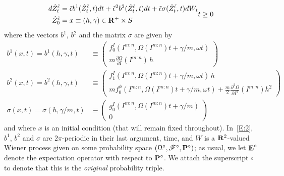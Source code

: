 \begin{equation}
\begin{aligned}
d \hat Z_t^{\tilde\epsilon} &= \tilde\epsilon  b^1 (\hat Z_t^{\tilde\epsilon},t) dt
  + \tilde\epsilon^2 b^2 (\hat Z_t^{\tilde\epsilon},t) dt
+ \tilde\epsilon \sigma(\hat Z_t^{\tilde\epsilon},t) d W_t \\
\hat Z^{\tilde\epsilon}_{0} &= x\equiv(h,\gamma) \in \mathbf R^+ \times S
\end{aligned} t \ge 0
\label{E:2}
\end{equation}
where the vectors $b^1,\,b^2$ and the matrix $\sigma$ are given by
\begin{equation*}
\begin{aligned}
b^1(x,t)= b^1({h, \gamma},t)&\equiv
\begin{pmatrix} f^I_{0}(I^{m:n},\Omega(I^{m:n}) t +  \gamma/m , \omega t) \\  m\frac{\partial \Omega}{\partial I} (I^{m:n}) \,{h}\end{pmatrix} \\
b^2(x,t)= b^2({h, \gamma},t)&\equiv
\begin{pmatrix} f^I_{1}(I^{m:n}, \Omega(I^{m:n}) t + \gamma/m, \omega t) \, {h} \\  mf^{\phi}_{0}(I^{m:n},\Omega(I^{m:n}) t +  \gamma/m , \omega t)+\frac{m}{2} \frac{\partial^2 \Omega}{\partial I^2}(I^{m:n}) h^2\end{pmatrix} \\
\sigma(x,t)= \sigma({h, \gamma/m},t) &\equiv \begin{pmatrix}
g^I_0(I^{m:n}, \Omega(I^{m:n}) t +  \gamma/m )\\
0 \end{pmatrix}
\end{aligned}
\end{equation*}
and where $x$ is an initial condition (that will remain fixed throughout). In~\eqref{E:2}, $b^1$, $b^2$ and $\sigma$ are $2 \pi$-periodic in their last argument, time, and $W$ is a $\mathbf R^2$-valued Wiener process given on some probability space $(\Omega^\circ, \mathscr F^\circ, \mathbf P^\circ)$; as usual, we let $\operatorname{\mathbf E}^\circ$ denote the expectation operator with respect to $\mathbf P^\circ$. We attach the superscript $\circ$ to denote that this is the \emph{original} probability triple.

